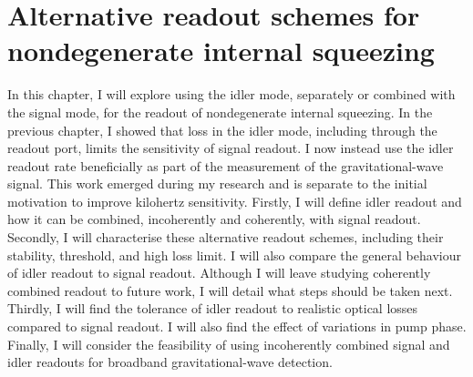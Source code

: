 \chapter{Alternative readout schemes for nondegenerate internal squeezing}
\label{chp:idler_readout}

In this chapter, I will explore using the idler mode, separately or combined with the signal mode, for the readout of nondegenerate internal squeezing. In the previous chapter, I showed that loss in the idler mode, including through the readout port, limits the sensitivity of signal readout. I now instead use the idler readout rate beneficially as part of the measurement of the gravitational-wave signal.
This work emerged during my research and is separate to the initial motivation to improve kilohertz sensitivity. %
Firstly, I will define idler readout and how it can be combined, incoherently and coherently, with signal readout. %
Secondly, I will characterise these alternative readout schemes, including their stability, threshold, and high loss limit. I will also compare the general behaviour of idler readout to signal readout. Although I will leave studying coherently combined readout to future work, I will detail what steps should be taken next.
Thirdly, I will find the tolerance of idler readout to realistic optical losses compared to signal readout. %
I will also find the effect of variations in pump phase.  
Finally, I will consider the feasibility of using incoherently combined signal and idler readouts for broadband gravitational-wave detection. %


